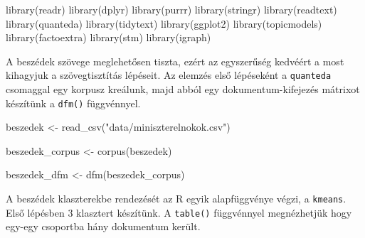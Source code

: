 \documentclass[
]{book}
\newenvironment{Shaded}{\begin{snugshade}}{\end{snugshade}}
\newcommand{\AttributeTok}[1]{\textcolor[rgb]{0.77,0.63,0.00}{#1}}
\newcommand{\CommentTok}[1]{\textcolor[rgb]{0.56,0.35,0.01}{\textit{#1}}}
\newcommand{\DecValTok}[1]{\textcolor[rgb]{0.00,0.00,0.81}{#1}}
\newcommand{\FunctionTok}[1]{\textcolor[rgb]{0.00,0.00,0.00}{#1}}
\newcommand{\NormalTok}[1]{#1}
\newcommand{\OtherTok}[1]{\textcolor[rgb]{0.56,0.35,0.01}{#1}}
\newcommand{\SpecialCharTok}[1]{\textcolor[rgb]{0.00,0.00,0.00}{#1}}
\newcommand{\StringTok}[1]{\textcolor[rgb]{0.31,0.60,0.02}{#1}}
\begin{document}
\begin{Shaded}
\begin{Highlighting}[]
\FunctionTok{library}\NormalTok{(readr)}
\FunctionTok{library}\NormalTok{(dplyr)}
\FunctionTok{library}\NormalTok{(purrr)}
\FunctionTok{library}\NormalTok{(stringr)}
\FunctionTok{library}\NormalTok{(readtext)}
\FunctionTok{library}\NormalTok{(quanteda)}
\FunctionTok{library}\NormalTok{(tidytext)}
\FunctionTok{library}\NormalTok{(ggplot2)}
\FunctionTok{library}\NormalTok{(topicmodels)}
\FunctionTok{library}\NormalTok{(factoextra)}
\FunctionTok{library}\NormalTok{(stm)}
\FunctionTok{library}\NormalTok{(igraph)}
\end{Highlighting}
\end{Shaded}

A beszédek szövege meglehetősen tiszta, ezért az egyszerűség kedvéért a
most kihagyjuk a szövegtisztítás lépéseit. Az elemzés első lépéseként a
\texttt{quanteda} csomaggal egy korpusz kreálunk, majd abból egy
dokumentum-kifejezés mátrixot készítünk a \texttt{dfm()} függvénnyel.

\begin{Shaded}
\begin{Highlighting}[]
\NormalTok{beszedek }\OtherTok{\textless{}{-}} \FunctionTok{read\_csv}\NormalTok{(}\StringTok{"data/miniszterelnokok.csv"}\NormalTok{)}

\NormalTok{beszedek\_corpus }\OtherTok{\textless{}{-}} \FunctionTok{corpus}\NormalTok{(beszedek)}

\NormalTok{beszedek\_dfm }\OtherTok{\textless{}{-}} \FunctionTok{dfm}\NormalTok{(beszedek\_corpus)}
\end{Highlighting}
\end{Shaded}

A beszédek klaszterekbe rendezését az R egyik alapfüggvénye végzi, a
\texttt{kmeans}. Első lépésben 3 klasztert készítünk. A \texttt{table()}
függvénnyel megnézhetjük hogy egy-egy csoportba hány dokumentum került.

\begin{Shaded}
\end{Shaded}
\end{document}
